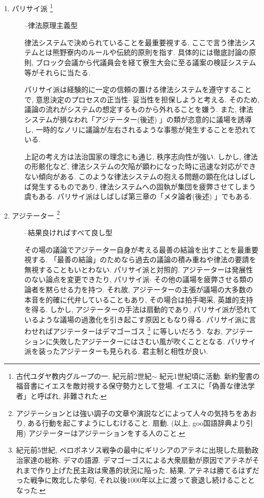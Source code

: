 \documentclass[10pt,b5jsbook,dvips,dvipdfmx,openany]{jsbook}
\theoremstyle{definition}
\begin{document}
			\begin{description}
			\item[1. パリサイ派 \footnote{古代ユダヤ教内グループの一. 紀元前2世紀$ \sim $ 紀元1世紀頃に活動. 新約聖書の福音書にイエスを敵対視する保守勢力として登場. イエスに「偽善な律法学者」と呼ばれ, 非難された.}] --律法原理主義型

			律法システムで決められていることを最重要視する. ここで言う律法システムとは熊野寮内のルールや伝統的原則を指す. 具体的には徹底討論の原則, ブロック会議から代議員会を経て寮生大会に至る議案の検証システム等がそれらに当たる.

			パリサイ派は経験的に一定の信頼の置ける律法システムを遵守することで, 意思決定のプロセスの正当性$ \cdot $ 妥当性を担保しようと考える. そのため, 議論の流れがシステムの想定するものから外れることを嫌う. また, 律法システムが損なわれ「アジテーター(後述) 」の類が恣意的に議場を誘導し, 一時的なノリに議論が左右されるような事態が発生することを恐れている.

			上記の考え方は法治国家の理念にも通じ, 秩序志向性が強い. しかし, 律法の形骸化など, 律法システムの欠陥が顕わになった時に迅速な対応ができない傾向がある. このような律法システムの抱える問題の顕在化はしばしば発生するものであり, 律法システムへの固執が集団を疲弊させてしまう虞もある. パリサイ派はしばしば第三章の「メタ論者(後述) 」でもある.

			\item[2. アジテーター \footnote{アジテーションとは強い調子の文章や演説などによって人々の気持ちをあおり, ある行動を起こすようにしむけること.  扇動. (以上, goo国語辞典より引用) アジテーターはアジテーションをする人のこと. }] --結果良ければすべて良し型

			その場の議論でアジテーター自身が考える最善の結論を出すことを最重要視する. 「最善の結論」のためなら過去の議論の積み重ねや律法の要請を無視することもいとわない. パリサイ派と対照的. アジテーターは発展性のない論点を変更できたり, パリサイ派$ \cdot $ その他の議場を疲弊させる類の論者を黙らせる力を持つ. それ故, アジテーターの主張が議場の大多数の本音を的確に代弁していることもあり, その場合は拍手喝采, 英雄的支持を得る. しかし, アジテーターの手法は扇動的であり, パリサイ派が恐れているような議場の過激化を引き起こす原因ともなり得る. パリサイ派に言わせればアジテーターはデマゴーゴス \footnote{紀元前5世紀, ペロポネソス戦争の最中にギリシアのアテネに出現した扇動政治家達の総称. デマの語源. デマゴーゴスによる大衆扇動が原因でアテネがそれまで作り上げた民主政は衆愚的状況に陥った. 結果, アテネは勝てるはずだった戦争に敗北した挙句, それ以後1000年以上に渡って衰退し続けることとなった. } に等しいだろう. なお, アジテーションに失敗したアジテーターにはさむい風が吹くこととなる.
パリサイ派を装ったアジテーターも見られる. 君主制と相性が良い.


\end{description}
\end{document}
